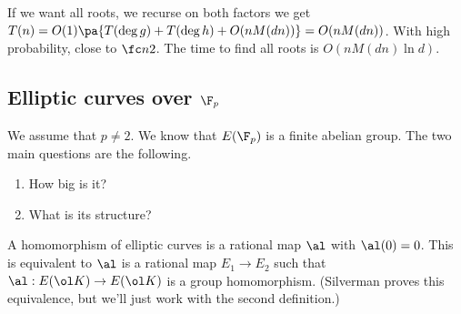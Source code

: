 If we want all roots, we recurse on both factors we get $T(n)=O(1)\pa{T(\deg g)+T(\deg h)+O(nM(dn))}=O(nM(dn))$. With high probability, close to $\fc n2$. The time to find all roots is $O(nM(dn)\ln d)$.

\subsection{Elliptic curves over $\F_p$}
We assume that $p\ne 2$. We know that $E(\F_p)$ is a finite abelian group. The two main questions are the following.
\begin{enumerate}
\item
How big is it?
\item
What is its structure?
\end{enumerate}
A homomorphism of elliptic curves is a rational map $\al$ with $\al(0)=0$. This is equivalent to $\al$ is a rational map $E_1\to E_2$ such that $\al:E(\ol K)\to E(\ol K)$ is a group homomorphism. (Silverman proves this equivalence, but we'll just work with the second definition.)

